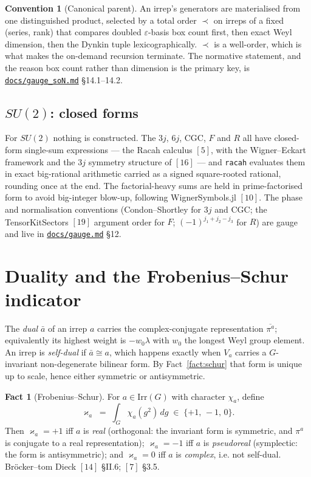 \documentclass[11pt,a4paper]{article}
\theoremstyle{plain}
\theoremstyle{definition}
\newtheorem{fact}[theorem]{Fact}
\newtheorem{convention}[theorem]{Convention}
\newcommand{\Irr}{\mathrm{Irr}}
\newcommand{\dual}[1]{\bar{#1}}
\newcommand{\code}[1]{\texttt{#1}}
\newcommand{\gaugemd}{\href{https://github.com/Ryo-wtnb11/racah/blob/main/docs/gauge.md}{\code{docs/gauge.md}}}
\newcommand{\gaugeson}{\href{https://github.com/Ryo-wtnb11/racah/blob/main/docs/gauge_soN.md}{\code{docs/gauge\_soN.md}}}
\begin{document}
\begin{convention}[Canonical parent]
An irrep's generators are materialised from one distinguished product, selected
by a total order $\prec$ on irreps of a fixed (series, rank) that compares
doubled $\varepsilon$-basis box count first, then exact Weyl dimension, then
the Dynkin tuple lexicographically. $\prec$ is a well-order, which is what makes
the on-demand recursion terminate. The normative statement, and the reason box
count rather than dimension is the primary key, is \gaugeson{} \S14.1--14.2.
\end{convention}

\subsection{$SU(2)$: closed forms}
\label{sec:su2}

For $SU(2)$ nothing is constructed. The $3j$, $6j$, CGC, $F$ and $R$ all have
closed-form single-sum expressions --- the Racah calculus $[5]$, with the
Wigner--Eckart framework and the $3j$ symmetry structure of $[16]$ --- and
\code{racah} evaluates them in exact big-rational arithmetic carried as a
signed square-rooted rational, rounding once at the end. The factorial-heavy
sums are held in prime-factorised form to avoid big-integer blow-up, following
WignerSymbols.jl $[10]$. The phase and normalisation conventions
(Condon--Shortley for $3j$ and CGC; the TensorKitSectors $[19]$ argument order
for $F$; $(-1)^{j_1+j_2-j_3}$ for $R$) are gauge and live in \gaugemd{} \S12.

\section{Duality and the Frobenius--Schur indicator}
\label{sec:fs}

The \emph{dual} $\dual a$ of an irrep $a$ carries the complex-conjugate
representation $\overline{\pi^a}$; equivalently its highest weight is
$-w_0\lambda$ with $w_0$ the longest Weyl group element. An irrep is
\emph{self-dual} if $\dual a\cong a$, which happens exactly when $V_a$ carries a
$G$-invariant non-degenerate bilinear form. By Fact~\ref{fact:schur} that form
is unique up to scale, hence either symmetric or antisymmetric.

\begin{fact}[Frobenius--Schur]\label{fact:fs}
For $a\in\Irr(G)$ with character $\chi_a$, define
\begin{equation}\label{eq:fs}
  \varkappa_a \;=\; \int_G \chi_a(g^2)\, dg
  \;\in\; \{+1,\,-1,\,0\}.
\end{equation}
Then $\varkappa_a=+1$ iff $a$ is \emph{real} (orthogonal: the invariant form is
symmetric, and $\pi^a$ is conjugate to a real representation);
$\varkappa_a=-1$ iff $a$ is \emph{pseudoreal} (symplectic: the form is
antisymmetric); and $\varkappa_a=0$ iff $a$ is \emph{complex}, i.e. not
self-dual. Br\"ocker--tom Dieck $[14]$ \S II.6; $[7]$ \S3.5.
\end{fact}
\end{document}
